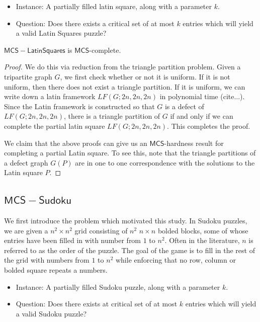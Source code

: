 \documentclass[runningheads,a4paper]{llncs}
\begin{document}
\begin{definition}
\begin{itemize}
\item Instance: A partially filled latin square, along with a parameter $k$. 
\item Question: Does there exists a critical set of at most  $k$ entries which will yield a valid Latin Squares puzzle?
\end{itemize}


\begin{theorem}
$\mathsf{MCS-Latin Squares}$ is $\mathsf{MCS}$-complete.
\end{theorem}

\begin{proof}
We do this via reduction from the triangle partition problem. Given a tripartite graph $G$, we first check whether or not it is uniform. If it is not uniform, then there does not exist a triangle partition. If it is uniform, we can write down a latin framework $LF(G;2n,2n,2n)$ in polynomial time (cite...). Since the Latin framework is constructed so that $G$ is a defect of $LF(G;2n,2n,2n)$, there is a triangle partition of $G$ if and only if we can complete the partial latin square $LF(G;2n,2n,2n)$. This completes the proof.

We claim that the above proofs can give us an $\mathsf{MCS}$-hardness result for completing a partial Latin square. To see this, note that the triangle partitions of a defect graph $G(P)$ are in one to one correspondence with the solutions to the Latin square $P$.
\end{proof}

\subsection{$\mathsf{MCS-Sudoku}$}

We first introduce the problem which motivated this study. In Sudoku puzzles, we are given a $n^2 \times n^2$ grid consisting of $n^2$ $n \times n$ bolded blocks, some of whose entries have been filled in with number from $1$ to $n^2$. Often in the literature, $n$ is referred to as the order of the puzzle. The goal of the game is to fill in the rest of the grid with numbers from $1$ to $n^2$ while enforcing that no row, column or bolded square repeats a numbers. 

\begin{itemize}
\item Instance: A partially filled Sudoku puzzle, along with a parameter $k$.
\item Question: Does there exists at critical set of at most $k$ entries which will yield a valid Sudoku puzzle?
\end{itemize}


\end{definition}
\end{document}
